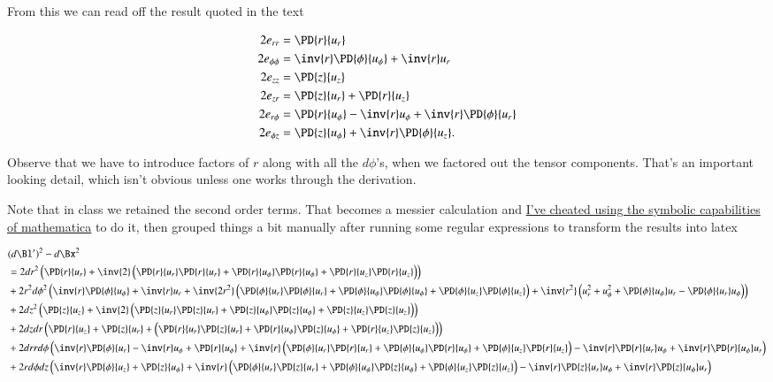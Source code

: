 From this we can read off the result quoted in the text

\begin{align}\label{eqn:continuumL2:470}
2 e_{rr} &= \PD{r}{u_r}  \\
2 e_{\phi\phi} &= \inv{r} \PD{\phi}{u_\phi} +\inv{r} u_r  \\
2 e_{zz} &= \PD{z}{u_z}  \\
2 e_{zr} &= \PD{z}{u_r} + \PD{r}{u_z} \\
2 e_{r\phi} &= \PD{r}{u_\phi} - \inv{r} u_\phi + \inv{r} \PD{\phi}{u_r} \\
2 e_{\phi z} &= \PD{z}{u_\phi} +\inv{r} \PD{\phi}{u_z}.
\end{align}

Observe that we have to introduce factors of $r$ along with all the $d\phi$'s, when we factored out the tensor components.  That's an important looking detail, which isn't obvious unless one works through the derivation.

Note that in class we retained the second order terms.  That becomes a messier calculation and \href{https://github.com/peeterjoot/physicsplay/blob/master/notes/phy454/strainTensorCylindrical.cdf}{I've cheated using the symbolic capabilities of mathematica} to do it, then grouped things a bit manually after running some regular expressions to transform the results into latex

\begin{equation}\label{eqn:continuumL2:490}
\begin{aligned}
&(d\Bl')^2 - d\Bx^2 \\
&= 2 dr^2 \left(
\PD{r}{u_r} 
+ \inv{2} \left(
\PD{r}{u_r} \PD{r}{u_r}
+ 
\PD{r}{u_\phi} \PD{r}{u_\phi}
+ 
\PD{r}{u_z} \PD{r}{u_z}
\right)
\right) \\
& + 2 r^2 d\phi^2 \left(
\inv{r} \PD{\phi}{u_\phi} 
+ \inv{r} u_r 
+
\inv{2 r^2} \left(
  \PD{\phi}{u_r} \PD{\phi}{u_r}
+ \PD{\phi}{u_\phi} \PD{\phi}{u_\phi}
+ \PD{\phi}{u_z} \PD{\phi}{u_z}
\right)
+ \inv{r^2} \left(
u_r^2
+
u_\phi^2 
+
\PD{\phi}{u_\phi} u_r 
- 
\PD{\phi}{u_r} u_\phi 
\right)
\right) \\
&+ 2 dz^2 \left(
  \PD{z}{u_z} 
+ \inv{2} \left( 
  \PD{z}{u_r} \PD{z}{u_r}
+ \PD{z}{u_\phi} \PD{z}{u_\phi}
+ \PD{z}{u_z} \PD{z}{u_z}
\right)
\right) \\
&+ 2 
dz
dr
\left(
  \PD{r}{u_z} 
+ \PD{z}{u_r} 
+ 
\left(
\PD{r}{u_r} \PD{z}{u_r} 
+ \PD{r}{u_\phi} \PD{z}{u_\phi} 
+ \PD{r}{u_z} \PD{z}{u_z}
\right) 
\right) 
\\
&+ 2 
dr
r d\phi 
\left( 
 \inv{r} \PD{\phi}{u_r} 
- \inv{r} u_\phi 
+ \PD{r}{u_\phi} 
+ \inv{r}
\left(
  \PD{\phi}{u_r} \PD{r}{u_r} 
+ \PD{\phi}{u_\phi} \PD{r}{u_\phi} 
+ \PD{\phi}{u_z} \PD{r}{u_z} 
\right)
- \inv{r} \PD{r}{u_r} u_\phi 
+ \inv{r} \PD{r}{u_\phi} u_r 
\right) \\
&+ 2 r d\phi dz \left(
  \inv{r} \PD{\phi}{u_z} 
+ \PD{z}{u_\phi} 
+ \inv{r} 
\left(
  \PD{\phi}{u_r} \PD{z}{u_r} 
+ \PD{\phi}{u_\phi} \PD{z}{u_\phi} 
+ \PD{\phi}{u_z} \PD{z}{u_z} 
\right)
- \inv{r} \PD{z}{u_r} u_\phi 
+ \inv{r} \PD{z}{u_\phi} u_r 
\right) \\
\end{aligned}
\end{equation}


